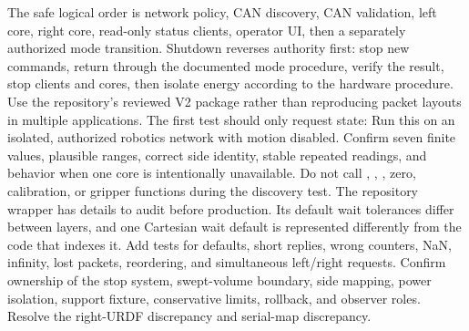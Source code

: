 {}
\markdownRendererSectionEnd \markdownRendererSectionBegin
{}\markdownRendererInterblockSeparator
{}The safe logical order is network policy, CAN discovery, CAN validation, left core, right core, read-only status clients, operator UI, then a separately authorized mode transition. Shutdown reverses authority first: stop new commands, return through the documented mode procedure, verify the result, stop clients and cores, then isolate energy according to the hardware procedure.\markdownRendererInterblockSeparator
{}
\markdownRendererSectionEnd 
\markdownRendererSectionEnd \markdownRendererSectionBegin
{}\markdownRendererInterblockSeparator
{}Use the repository's reviewed V2 package rather than reproducing packet layouts in multiple applications. The first test should only request state:\markdownRendererInterblockSeparator
{}\markdownRendererInterblockSeparator
{}Run this on an isolated, authorized robotics network with motion disabled. Confirm seven finite values, plausible ranges, correct side identity, stable repeated readings, and behavior when one core is intentionally unavailable. Do not call , , , zero, calibration, or gripper functions during the discovery test.\markdownRendererParagraphSeparator
{}The repository wrapper has details to audit before production. Its default wait tolerances differ between layers, and one Cartesian wait default is represented differently from the code that indexes it. Add tests for defaults, short replies, wrong counters, NaN, infinity, lost packets, reordering, and simultaneous left/right requests.\markdownRendererInterblockSeparator
{}
\markdownRendererSectionEnd \markdownRendererSectionBegin
{}\markdownRendererInterblockSeparator
{}\markdownRendererSectionBegin
{}\markdownRendererInterblockSeparator
{}Confirm ownership of the stop system, swept-volume boundary, side mapping, power isolation, support fixture, conservative limits, rollback, and observer roles. Resolve the right-URDF discrepancy and serial-map discrepancy.\markdownRendererInterblockSeparator
